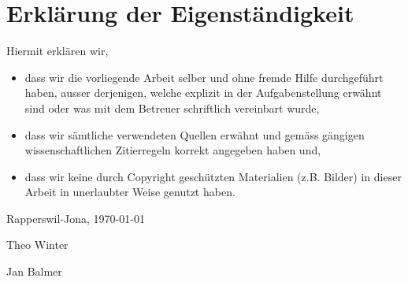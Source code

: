 \chapter*{Erklärung der Eigenständigkeit}

Hiermit erklären wir,

\begin{itemize}
\item dass wir die vorliegende Arbeit selber und ohne fremde Hilfe durchgeführt haben, ausser derjenigen, welche explizit in der Aufgabenstellung erwähnt sind oder was mit dem Betreuer schriftlich vereinbart wurde,

\item dass wir sämtliche verwendeten Quellen erwähnt und gemäss gängigen wissenschaftlichen Zitierregeln korrekt angegeben haben und,

\item dass wir keine durch Copyright geschützten Materialien (z.B. Bilder) in dieser Arbeit in unerlaubter Weise genutzt haben.
\end{itemize}


Rapperswil-Jona, \today




Theo Winter




Jan Balmer
